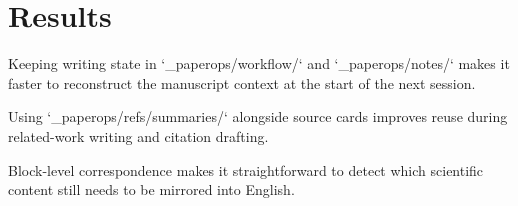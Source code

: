 \section{Results}

Keeping writing state in `_paperops/workflow/` and `_paperops/notes/` makes it faster to reconstruct the manuscript context at the start of the next session.

Using `_paperops/refs/summaries/` alongside source cards improves reuse during related-work writing and citation drafting.

Block-level correspondence makes it straightforward to detect which scientific content still needs to be mirrored into English.
